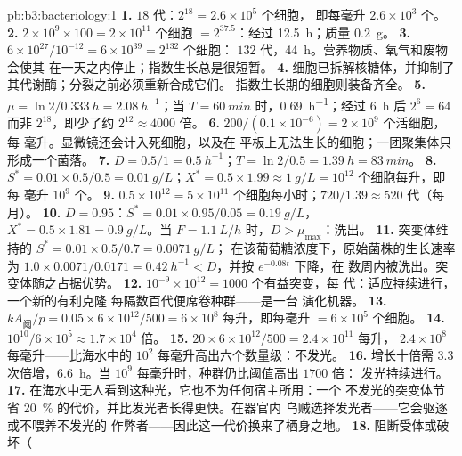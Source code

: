 \begin{solution}{pb:b3:bacteriology:1}
\textbf{1.} $18$ 代：$2^{18} = 2.6\times 10^{5}$ 个细胞，
即每毫升 $2.6\times 10^{3}$ 个。
\textbf{2.} $2\times 10^{9}\times 100 = 2\times 10^{11}$ 个细胞 $=
2^{37.5}$：经过 \qty{12.5}{h}；质量 \qty{0.2}{g}。
\textbf{3.} $6\times 10^{27}/10^{-12} = 6\times 10^{39} = 2^{132}$ 个细胞：
$132$ 代，\qty{44}{h}。营养物质、氧气和废物会使其
在一天之内停止；指数生长总是很短暂。
\textbf{4.} 细胞已拆解核糖体，并抑制了
其代谢酶；分裂之前必须重新合成它们。
指数生长期的细胞则装备齐全。
\textbf{5.} $\mu = \ln 2/\qty{0.333}{h} = \qty{2.08}{h^{-1}}$；当 $T =
\qty{60}{min}$ 时，\qty{0.69}{h^{-1}}；经过 \qty{6}{h} 后 $2^{6} = 64$
而非 $2^{18}$，即少了约 $2^{12} \approx 4000$ 倍。
\textbf{6.} $200/(0.1\times 10^{-6}) = 2\times 10^{9}$ 个活细胞，每
毫升。显微镜还会计入死细胞，以及在
平板上无法生长的细胞；一团聚集体只形成一个菌落。
\textbf{7.} $D = 0.5/1 = \qty{0.5}{h^{-1}}$；$T = \ln 2/0.5 =
\qty{1.39}{h} = \qty{83}{min}$。
\textbf{8.} $S^{*} = 0.01\times 0.5/0.5 = \qty{0.01}{g/L}$；$X^{*} =
0.5\times 1.99 \approx \qty{1}{g/L} = 10^{12}$ 个细胞每升，即每
毫升 $10^{9}$ 个。
\textbf{9.} $0.5\times 10^{12} = 5\times 10^{11}$ 个细胞每小时；$720/1.39
\approx 520$ 代（每月）。
\textbf{10.} $D = 0.95$：$S^{*} = 0.01\times 0.95/0.05 = \qty{0.19}{g/L}$，
$X^{*} = 0.5\times 1.81 = \qty{0.9}{g/L}$。当 $F = \qty{1.1}{L/h}$ 时，$D
> \mu_{\max}$：洗出。
\textbf{11.} 突变体维持的 $S^{*} = 0.01\times 0.5/0.7 = \qty{0.0071}{g/L}$；
在该葡萄糖浓度下，原始菌株的生长速率为 $1.0\times 0.0071/0.0171 =
\qty{0.42}{h^{-1}} < D$，并按 $e^{-0.08t}$ 下降，在
数周内被洗出。突变体随之占据优势。
\textbf{12.} $10^{-9}\times 10^{12} = 1000$ 个有益突变，每
代：适应持续进行，一个新的有利克隆
每隔数百代便席卷种群——是一台
演化机器。
\textbf{13.} $kA_{\text{阈}}/p = 0.05\times 6\times 10^{12}/500 =
6\times 10^{8}$ 每升，即每毫升 $= 6\times 10^{5}$ 个细胞。
\textbf{14.} $10^{10}/6\times 10^{5} \approx 1.7\times 10^{4}$ 倍。
\textbf{15.} $20\times 6\times 10^{12}/500 = 2.4\times 10^{11}$ 每升，
$2.4\times 10^{8}$ 每毫升——比海水中的
$10^{2}$ 每毫升高出六个数量级：不发光。
\textbf{16.} 增长十倍需 $3.3$ 次倍增，\qty{6.6}{h}。当 $10^{9}$
每毫升时，种群仍比阈值高出 $1700$ 倍：
发光持续进行。
\textbf{17.} 在海水中无人看到这种光，它也不为任何宿主所用：一个
不发光的突变体节省 \qty{20}{\%} 的代价，并比发光者长得更快。在器官内
乌贼选择发光者——它会驱逐或不喂养不发光的
作弊者——因此这一代价换来了栖身之地。
\textbf{18.} 阻断受体或破坏（

\end{solution}

